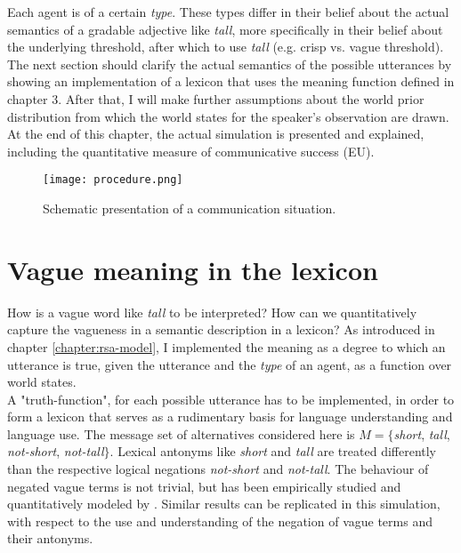 Each agent is of a certain \textit{type}. These types differ in their belief about the actual semantics of a gradable adjective like \textit{tall}, more specifically in their belief about the underlying threshold, after which to use \textit{tall} (e.g. crisp vs. vague threshold). The next section should clarify the actual semantics of the possible utterances by showing an implementation of a lexicon that uses the meaning function defined in chapter 3. After that, I will make further assumptions about the world prior distribution from which the world states for the speaker's observation are drawn. At the end of this chapter, the actual simulation is presented and explained, including the quantitative measure of communicative success (EU).
\begin{figure}
 \texttt{[image: procedure.png]}
 \caption{Schematic presentation of a communication situation.}
 \label{figure:procedure}
\end{figure}
\section{Vague meaning in the lexicon}
How is a vague word like \textit{tall} to be interpreted? How can we quantitatively capture the vagueness in a semantic description in a lexicon? As introduced in chapter \ref{chapter:rsa-model}, I implemented the meaning as a degree to which an utterance is true, given the utterance and the \textit{type} of an agent, as a function over world states.\\

A "truth-function", for each possible utterance has to be implemented, in order to form a lexicon that serves as a rudimentary basis for language understanding and language use. The message set of alternatives considered here is $M = \{$\textit{short}, \textit{tall}, \textit{not-short}, \textit{not-tall}$\}$. Lexical antonyms like \textit{short} and \textit{tall} are treated differently than the respective logical negations \textit{not-short} and \textit{not-tall}. The behaviour of negated vague terms is not trivial, but has been empirically studied and quantitatively modeled by \cite{tesslernot}. Similar results can be replicated in this simulation, with respect to the use and understanding of the negation of vague terms and their antonyms.\\

